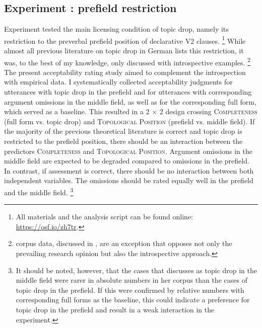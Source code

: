 \subsection{Experiment : prefield restriction }
\label{sec:exp.prefield}
Experiment  tested the main licensing condition of topic drop, namely its restriction to the preverbal prefield position of declarative V2 clauses.%
\footnote{All materials and the analysis script can be found online: \url{https://osf.io/zh7tr}.}
%
While almost all previous literature on topic drop in German lists this restriction, it was, to the best of my knowledge, only discussed with introspective examples.%
\footnote{ corpus data,  discussed in , are an exception that opposes not only the prevailing research opinion but also the introspective approach.
}
%
The present acceptability rating study aimed to complement the introspection with empirical data.
I systematically collected acceptability judgments for utterances with topic drop in the prefield and for utterances with corresponding argument omissions  in the middle field, as well as for the corresponding full form, which served as a baseline.
This resulted in a 2 $\times$ 2 design crossing \textsc{Completeness} (full form vs. topic drop) and \textsc{Topological Position} (prefield vs. middle field).
If the majority of the previous theoretical literature is correct and topic drop is restricted to the prefield position, there should be an interaction between the predictors \textsc{Completeness} and \textsc{Topological Position}.
Argument omissions in the middle field are expected to be degraded compared to omissions in the prefield.
In contrast, if  assessment is correct, there should be no interaction between both independent variables.
The omissions should be rated equally well in the prefield and the middle field.%
\footnote{It should be noted, however, that the cases that \citet{helmer2016} discusses as topic drop in the middle field were rarer in absolute numbers in her corpus  than the cases of topic drop in the prefield.
If this were confirmed by relative numbers with corresponding full forms as the baseline, this could indicate a preference for topic drop in the prefield and result in a weak interaction in the experiment.}
%


